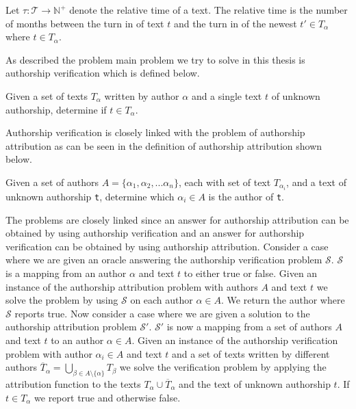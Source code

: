 \begin{definition}
    \label{def:text_relative_time}

    Let $\tau \colon \mathcal{T} \rightarrow \mathbb{N}^+$ denote the relative
    time of a text. The relative time is the number of months between the turn
    in of text $t$ and the turn in of the newest $t' \in T_\alpha$ where $t \in
    T_\alpha$.

\end{definition}


As described the problem main problem we try to solve in this thesis is
authorship verification which is defined below.

\begin{definition}
    \label{def:authorship_verification}

    Given a set of texts $T_\alpha$ written by author $\alpha$ and a single
    text $t$ of unknown authorship, determine if $t \in T_\alpha$.

\end{definition}

Authorship verification is closely linked with the problem of authorship
attribution as can be seen in the definition of authorship attribution shown
below.

\begin{definition}

    Given a set of authors $A = \{\alpha_1, \alpha_2,...\alpha_n\}$, each with
    set of text $T_{\alpha_i}$, and a text of unknown authorship \texttt{t},
    determine which $\alpha_i \in A$ is the author of \texttt{t}.

\end{definition}

The problems are closely linked since an answer for authorship attribution
can be obtained by using authorship verification and an answer for authorship
verification can be obtained by using authorship attribution. Consider a case
where we are given an oracle answering the authorship verification problem
$\mathcal{S}$. $\mathcal{S}$ is a mapping from an author $\alpha$ and text $t$
to either true or false. Given an instance of the authorship attribution problem
with authors $A$ and text $t$ we solve the problem by using $\mathcal{S}$ on
each author $\alpha \in A$. We return the author where $\mathcal{S}$ reports
true. Now consider a case where we are given a solution to the authorship
attribution problem $\mathcal{S}'$. $\mathcal{S}'$ is now a mapping from a set
of authors $A$ and text $t$ to an author $\alpha \in A$. Given an instance
of the authorship verification problem with author $\alpha_i \in A$ and text
$t$ and a set of texts written by different authors $\overline{T}_{\alpha} =
\bigcup_{\beta \in A \setminus \{\alpha\}} T_\beta$ we solve the verification
problem by applying the attribution function to the texts $T_{\alpha} \cup
\overline{T}_{\alpha}$ and the text of unknown authorship $t$. If $t \in
T_{\alpha}$ we report true and otherwise false.
